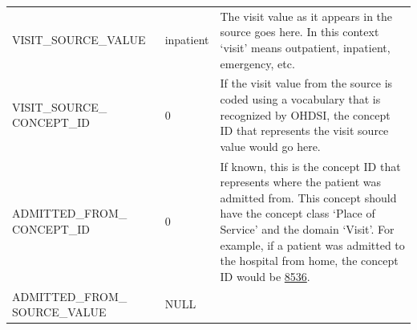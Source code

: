 \documentclass[]{book}
\begin{document}
\begin{longtable}[]{@{}lll@{}}
\begin{minipage}[t]{0.25\columnwidth}\raggedright\strut
VISIT\_SOURCE\_VALUE\strut
\end{minipage} & \begin{minipage}[t]{0.17\columnwidth}\raggedright\strut
inpatient\strut
\end{minipage} & \begin{minipage}[t]{0.49\columnwidth}\raggedright\strut
The visit value as it appears in the source goes here. In this context
`visit' means outpatient, inpatient, emergency, etc.\strut
\end{minipage}\tabularnewline
\begin{minipage}[t]{0.25\columnwidth}\raggedright\strut
VISIT\_SOURCE\_ CONCEPT\_ID\strut
\end{minipage} & \begin{minipage}[t]{0.17\columnwidth}\raggedright\strut
0\strut
\end{minipage} & \begin{minipage}[t]{0.49\columnwidth}\raggedright\strut
If the visit value from the source is coded using a vocabulary that is
recognized by OHDSI, the concept ID that represents the visit source
value would go here.\strut
\end{minipage}\tabularnewline
\begin{minipage}[t]{0.25\columnwidth}\raggedright\strut
ADMITTED\_FROM\_ CONCEPT\_ID\strut
\end{minipage} & \begin{minipage}[t]{0.17\columnwidth}\raggedright\strut
0\strut
\end{minipage} & \begin{minipage}[t]{0.49\columnwidth}\raggedright\strut
If known, this is the concept ID that represents where the patient was
admitted from. This concept should have the concept class `Place of
Service' and the domain `Visit'. For example, if a patient was admitted
to the hospital from home, the concept ID would be
\href{http://athena.ohdsi.org/search-terms/terms/8536}{8536}.\strut
\end{minipage}\tabularnewline
\begin{minipage}[t]{0.25\columnwidth}\raggedright\strut
ADMITTED\_FROM\_ SOURCE\_VALUE\strut
\end{minipage} & \begin{minipage}[t]{0.17\columnwidth}\raggedright\strut
NULL\strut
\end{minipage} & \begin{minipage}[t]{0.49\columnwidth}\raggedright\strut

\end{minipage}
\end{longtable}
\end{document}
